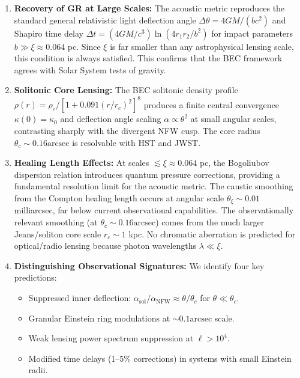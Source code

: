 \documentclass[11pt,a4paper]{article}
\newcommand{\arcsec}{\ensuremath{\text{arcsec}}}
\theoremstyle{definition}
\theoremstyle{remark}
\begin{document}
\begin{enumerate}[leftmargin=*, itemsep=0.3em]

\item \textbf{Recovery of GR at Large Scales:} The acoustic metric reproduces the standard general relativistic light deflection angle $\Delta\theta = 4GM/(bc^2)$ and Shapiro time delay $\Delta t = (4GM/c^3)\ln(4r_1r_2/b^2)$ for impact parameters $b \gg \xi \approx 0.064$ pc. Since $\xi$ is far smaller than any astrophysical lensing scale, this condition is always satisfied. This confirms that the BEC framework agrees with Solar System tests of gravity.

\item \textbf{Solitonic Core Lensing:} The BEC solitonic density profile $\rho(r) = \rho_c/[1 + 0.091(r/r_c)^2]^8$ produces a finite central convergence $\kappa(0) = \kappa_0$ and deflection angle scaling $\alpha \propto \theta^2$ at small angular scales, contrasting sharply with the divergent NFW cusp. The core radius $\theta_c \sim 0.16\arcsec$ is resolvable with HST and JWST.

\item \textbf{Healing Length Effects:} At scales $\lesssim \xi \approx 0.064$ pc, the Bogoliubov dispersion relation introduces quantum pressure corrections, providing a fundamental resolution limit for the acoustic metric. The caustic smoothing from the Compton healing length occurs at angular scale $\theta_\xi \sim 0.01$ milliarcsec, far below current observational capabilities. The observationally relevant smoothing (at $\theta_c \sim 0.16\arcsec$) comes from the much larger Jeans/soliton core scale $r_c \sim 1$ kpc. No chromatic aberration is predicted for optical/radio lensing because photon wavelengths $\lambda \ll \xi$.

\item \textbf{Distinguishing Observational Signatures:} We identify four key predictions:
\begin{itemize}[leftmargin=*, itemsep=0.2em]
\item Suppressed inner deflection: $\alpha_{\mathrm{sol}}/\alpha_{\mathrm{NFW}} \approx \theta/\theta_c$ for $\theta \ll \theta_c$.
\item Granular Einstein ring modulations at $\sim 0.1\arcsec$ scale.
\item Weak lensing power spectrum suppression at $\ell > 10^4$.
\item Modified time delays (1--5\% corrections) in systems with small Einstein radii.
\end{itemize}


\end{enumerate}
\end{document}
